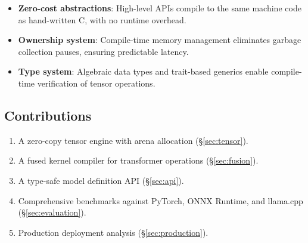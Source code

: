\begin{itemize}[leftmargin=1.1em]
    \item \textbf{Zero-cost abstractions}: High-level APIs compile to the same machine code as hand-written C, with no runtime overhead.
    \item \textbf{Ownership system}: Compile-time memory management eliminates garbage collection pauses, ensuring predictable latency.
    \item \textbf{Type system}: Algebraic data types and trait-based generics enable compile-time verification of tensor operations.
\end{itemize}

\subsection{Contributions}

\begin{enumerate}[leftmargin=1.4em]
    \item A zero-copy tensor engine with arena allocation (\S\ref{sec:tensor}).
    \item A fused kernel compiler for transformer operations (\S\ref{sec:fusion}).
    \item A type-safe model definition API (\S\ref{sec:api}).
    \item Comprehensive benchmarks against PyTorch, ONNX Runtime, and llama.cpp (\S\ref{sec:evaluation}).
    \item Production deployment analysis (\S\ref{sec:production}).
\end{enumerate}

